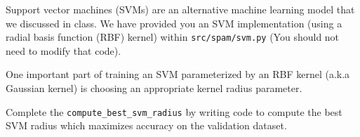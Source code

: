 \item {}
Support vector machines (SVMs) are an alternative machine learning model that we discussed in class.
We have provided you an SVM implementation (using a radial basis function (RBF) kernel) within \texttt{src/spam/svm.py} (You should not need to modify that code).

One important part of training an SVM parameterized by an RBF kernel (a.k.a Gaussian kernel) is choosing an appropriate kernel radius parameter.

Complete the \texttt{compute\_best\_svm\_radius} by writing code to compute the best SVM radius which maximizes accuracy on the validation dataset.\\[50pt]